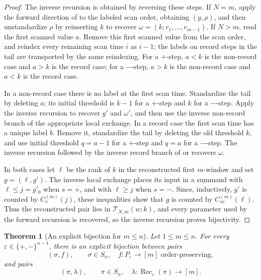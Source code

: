 \documentclass[11pt,letterpaper,reqno]{amsart}
\newtheorem{theorem}{Theorem}[section]
\theoremstyle{definition}
\newcommand{\eps}{\varepsilon}
\begin{document}
\begin{proof}
The inverse recursion is obtained by reversing these steps.  If \(N=m\), apply
the forward direction of  to the labeled
scan order, obtaining \((g,\rho)\), and then unstandardize \(\rho\) by
reinserting \(k\) to recover $\omega=(k;r_1,\ldots,r_{m-1})$.
If \(N>m\), read the first scanned value \(a\).  Remove this first scanned
value from the scan order, and reindex every remaining scan time \(i\) as
\(i-1\); the labels on record steps in the tail are transported by the same
reindexing.  For a \(+\)-step, \(a<k\) is the non-record case and \(a>k\) is
the record case; for a \(-\)-step, \(a>k\) is the non-record case and \(a<k\)
is the record case.

In a non-record case there is no label at the first scan time.  Standardize the
tail by deleting \(a\); its initial threshold is \(k-1\) for a \(+\)-step and
\(k\) for a \(-\)-step.  Apply the inverse recursion to recover \(g'\) and
\(\omega'\), and then use the inverse non-record branch of the appropriate
local exchange.  In a record case the first scan time has a unique label
\(b\).  Remove it, standardize the tail by deleting the old threshold \(k\),
and use initial threshold \(q=a-1\) for a \(+\)-step and \(q=a\) for a
\(-\)-step.  The inverse recursion followed by the inverse record branch of
 or  recovers
\(\omega\).

In both cases let \(\ell\) be the rank of \(k\) in the reconstructed first
\(m\)-window and set \(g=(\ell,g')\).  The inverse local exchange places its
input in a summand with \(\ell\le j=g'_0\) when \(s=+\), and with
\(\ell\ge j\) when \(s=-\).  Since, inductively, \(g'\) is counted by
\(C_v^{(m)}(j)\), these inequalities show that \(g\) is counted by
\(C_{sv}^{(m)}(\ell)\).  Thus the reconstructed pair lies in
\(\mathcal T_{N,m}(w;k)\), and every parameter used by the forward recursion
is recovered, so the inverse recursion proves bijectivity.
\end{proof}

\begin{theorem}[An explicit bijection for \(m\le n\)]
\label{thm:direct-bijection-m-le-n}
Let \(1\le m\le n\).  For every
\(\eps\in\{+,-\}^{n-1}\), there is an explicit bijection between pairs
\[
(\sigma,f),\qquad
\sigma\in S_n,\quad f:P_\eps\to[m]\text{ order-preserving},
\]
and pairs
\[
(\pi,\lambda),\qquad
\pi\in S_n,\quad
\lambda:\operatorname{Rec}_\eps(\pi)\to[m].
\]
\end{theorem}
\end{document}
